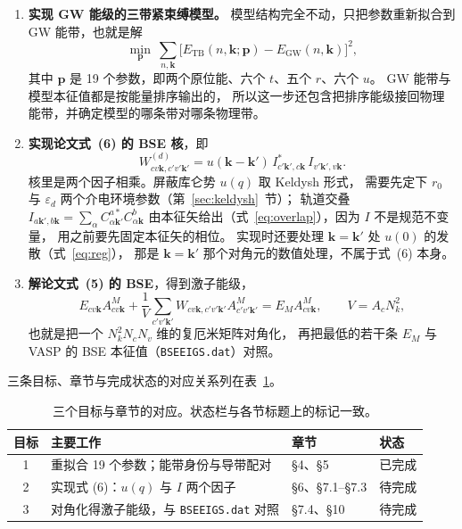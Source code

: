 \documentclass[11pt,a4paper]{ctexart}
\newcommand{\kk}{\mathbf{k}}
\newcommand{\kq}{\mathbf{k}'}
\newcommand{\eps}{\varepsilon}
\begin{document}
\begin{enumerate}
  \item \textbf{实现 GW 能级的三带紧束缚模型。}
        模型结构完全不动，只把参数重新拟合到 GW 能带，也就是解
        \[
        \min_{\mathbf p}\ \sum_{n,\kk}\big[E_{\mathrm{TB}}(n,\kk;\mathbf p)
        -E_{\mathrm{GW}}(n,\kk)\big]^2 ,
        \]
        其中 $\mathbf p$ 是 19 个参数，即两个原位能、六个 $t$、五个 $r$、六个 $u$。
        GW 能带与模型本征值都是按能量排序输出的，
        所以这一步还包含把排序能级接回物理能带，并确定模型的哪条带对哪条物理带。

  \item \textbf{实现论文式~(6) 的 BSE 核}，即
        \[
        W^{(d)}_{cv\kk,c'v'\kq}
        =u(\kk-\kq)\,I^{*}_{c'\kq,c\kk}\,I_{v'\kq,v\kk} .
        \]
        核里是两个因子相乘。屏蔽库仑势 $u(q)$ 取 Keldysh 形式，
        需要先定下 $r_0$ 与 $\eps_d$ 两个介电环境参数（第~\ref{sec:keldysh}~节）；
        轨道交叠 $I_{a\kq,b\kk}=\sum_\alpha C^{a*}_{\alpha\kq}C^{b}_{\alpha\kk}$
        由本征矢给出（式~\eqref{eq:overlap}），因为 $I$ 不是规范不变量，
        用之前要先固定本征矢的相位。
        实现时还要处理 $\kk=\kq$ 处 $u(0)$ 的发散（式~\eqref{eq:reg}），
        那是 $\kk=\kq$ 那个对角元的数值处理，不属于式~(6) 本身。

  \item \textbf{解论文式~(5) 的 BSE}，得到激子能级，
        \[
        E_{cv\kk}A^{M}_{cv\kk}
        +\frac{1}{V}\sum_{c'v'\kq}W_{cv\kk,c'v'\kq}A^{M}_{c'v'\kq}
        =E_{M}A^{M}_{cv\kk},
        \qquad V=A_cN_k^2 ,
        \]
        也就是把一个 $N_k^2N_cN_v$ 维的复厄米矩阵对角化，
        再把最低的若干条 $E_M$ 与 VASP 的 BSE 本征值（\texttt{BSEEIGS.dat}）对照。
\end{enumerate}

三条目标、章节与完成状态的对应关系列在表~\ref{tab:goals}。

\begin{table}[htbp]
\centering
\caption{三个目标与章节的对应。状态栏与各节标题上的标记一致。}
\label{tab:goals}
\begin{tabular}{@{}clll@{}}
\toprule
目标 & 主要工作 & 章节 & 状态\\
\midrule
1 & 重拟合 19 个参数；能带身份与导带配对 &
    \S4、\S5 & 已完成\\
2 & 实现式 (6)：$u(q)$ 与 $I$ 两个因子 &
    \S6、\S7.1--\S7.3 & 待完成\\
3 & 对角化得激子能级，与 \texttt{BSEEIGS.dat} 对照 &
    \S7.4、\S10 & 待完成\\
\bottomrule
\end{tabular}
\end{table}
\end{document}
